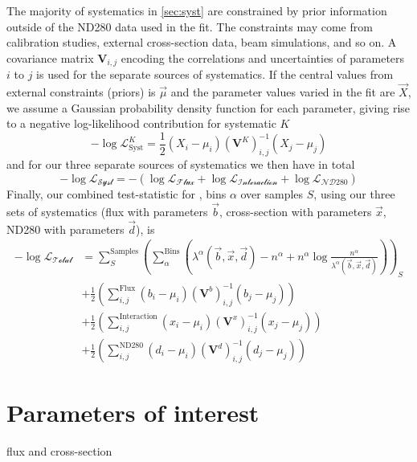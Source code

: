 The majority of systematics in \autoref{sec:syst} are constrained by prior information outside of the ND280 data used in the fit. The constraints may come from calibration studies, external cross-section data, beam simulations, and so on. A covariance matrix $\boldsymbol{V}_{i,j}$ encoding the correlations and uncertainties of parameters $i$ to $j$ is used for the separate sources of systematics. If the central values from external constraints (priors) is $\vec{\mu}$ and the parameter values varied in the fit are $\vec{X}$, we assume a Gaussian probability density function for each parameter, giving rise to a negative log-likelihood contribution for systematic $K$
\begin{equation}
-\log\mathcal{L}^K_\text{Syst} = \frac{1}{2}( X_i - \mu_i ) \left(\boldsymbol{V}^K\right)^{-1}_{i,j} ( X_j - \mu_j )
\end{equation}
and for our three separate sources of systematics we then have in total
\begin{equation}
-\log\mathcal{L_\text{Syst}} = -\left(\log\mathcal{L_\text{Flux}} + \log\mathcal{L_\text{Interaction}} + \log\mathcal{L_\text{ND280}}\right)
\end{equation}
Finally, our combined test-statistic for \pmu, \cosmu bins $\alpha$ over samples $S$, using our three sets of systematics (flux with parameters $\vec{b}$, cross-section with parameters $\vec{x}$, ND280 with parameters $\vec{d}$), is
\begin{equation}
\begin{split}
-\log\mathcal{L_\text{Total}} & =  \sum_S^\text{Samples} \left( \sum_{\alpha}^\text{Bins} \left( \lambda^\alpha(\vec{b},\vec{x},\vec{d}) - n^\alpha + n^\alpha\log\frac{n^\alpha}{\lambda^\alpha(\vec{b},\vec{x},\vec{d})} \right) \right)_S \\
 & + \frac{1}{2} \left( \sum_{i,j}^\text{Flux} ( b_i - \mu_i ) \left(\boldsymbol{V}^b\right)^{-1}_{i,j} ( b_j - \mu_j ) \right) \\
 & + \frac{1}{2} \left( \sum_{i,j}^\text{Interaction} ( x_i - \mu_i ) \left(\boldsymbol{V}^x\right)^{-1}_{i,j} ( x_j - \mu_j ) \right) \\
 & + \frac{1}{2} \left( \sum_{i,j}^\text{ND280} ( d_i - \mu_i ) \left(\boldsymbol{V}^d\right)^{-1}_{i,j} ( d_j - \mu_j ) \right)
\end{split}
\end{equation}

\section{Parameters of interest}
flux and cross-section

